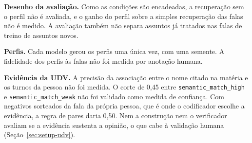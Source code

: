 \textbf{Desenho da avaliação.} Como as condições são encadeadas, a recuperação sem o perfil não é
avaliada, e o ganho do perfil sobre a simples recuperação das falas não é medido. A avaliação
também não separa assuntos já tratados nas falas de treino de assuntos novos.

\textbf{Perfis.} Cada modelo gerou os perfis uma única vez, com uma semente. A fidelidade dos perfis às falas não foi medida por anotação humana.

\textbf{Evidência da UDV.} A precisão da associação entre o nome citado na matéria e os turnos da
pessoa não foi medida. O corte de 0,45 entre \texttt{semantic\_match\_high} e
\texttt{semantic\_match\_weak} não foi validado como medida de confiança. Com negativos sorteados da
fala da própria pessoa, que é onde o codificador escolhe a evidência, a regra de pares daria 0,50. Nem
a construção nem o
verificador avaliam se a evidência sustenta a opinião, o que cabe à validação humana
(Seção~\ref{sec:setup-udv}).
